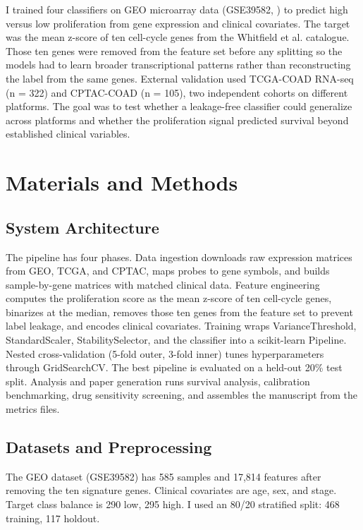 \documentclass[12pt]{article}
\begin{document}
I trained four classifiers on GEO microarray data (GSE39582, \citealp{marisa2013}) to predict high versus low proliferation from gene expression and clinical covariates. The target was the mean z-score of ten cell-cycle genes from the Whitfield et al. \citep{whitfield2002} catalogue. Those ten genes were removed from the feature set before any splitting so the models had to learn broader transcriptional patterns rather than reconstructing the label from the same genes. External validation used TCGA-COAD RNA-seq (n = 322) and CPTAC-COAD (n = 105), two independent cohorts on different platforms. The goal was to test whether a leakage-free classifier could generalize across platforms and whether the proliferation signal predicted survival beyond established clinical variables.

\section{Materials and Methods}

\subsection{System Architecture}

The pipeline has four phases. Data ingestion downloads raw expression matrices from GEO, TCGA, and CPTAC, maps probes to gene symbols, and builds sample-by-gene matrices with matched clinical data. Feature engineering computes the proliferation score as the mean z-score of ten cell-cycle genes, binarizes at the median, removes those ten genes from the feature set to prevent label leakage, and encodes clinical covariates. Training wraps VarianceThreshold, StandardScaler, StabilitySelector, and the classifier into a scikit-learn Pipeline. Nested cross-validation (5-fold outer, 3-fold inner) tunes hyperparameters through GridSearchCV. The best pipeline is evaluated on a held-out 20\% test split. Analysis and paper generation runs survival analysis, calibration benchmarking, drug sensitivity screening, and assembles the manuscript from the metrics files.

\subsection{Datasets and Preprocessing}

The GEO dataset (GSE39582) has 585 samples and 17,814 features after removing the ten signature genes. Clinical covariates are age, sex, and stage. Target class balance is 290 low, 295 high. I used an 80/20 stratified split: 468 training, 117 holdout.
\end{document}
